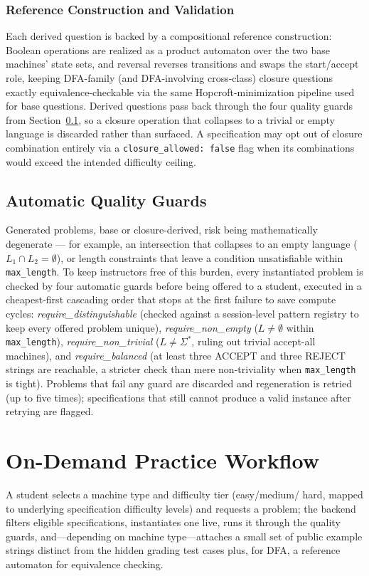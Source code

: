 \documentclass[sigconf]{acmart}
\begin{document}
\subsubsection{Reference Construction and Validation}
Each derived question is backed by a compositional reference construction: Boolean operations are realized as a product automaton over the two base machines' state sets, and reversal reverses transitions and swaps the start/accept role, keeping DFA-family (and DFA-involving cross-class) closure questions exactly equivalence-checkable via the same Hopcroft-minimization pipeline used for base questions. Derived questions pass back through the four quality guards from Section~\ref{sec:guards}, so a closure operation that collapses to a trivial or empty language is discarded rather than surfaced. A specification may opt out of closure combination entirely via a \texttt{closure\_allowed: false} flag when its combinations would exceed the intended difficulty ceiling.
\subsection{Automatic Quality Guards}
\label{sec:guards}
Generated problems, base or closure-derived, risk being mathematically degenerate --- for example, an intersection that collapses to an empty language ($L_1 \cap L_2 = \emptyset$), or length constraints that leave a condition unsatisfiable within \texttt{max\_length}. To keep instructors free of this burden, every instantiated problem is checked by four automatic guards before being offered to a student, executed in a cheapest-first cascading order that stops at the first failure to save compute cycles: \textit{require\_distinguishable} (checked against a session-level pattern registry to keep every offered problem unique), \textit{require\_non\_empty} ($L \neq \emptyset$ within \texttt{max\_length}), \textit{require\_non\_trivial} ($L \neq \Sigma^*$, ruling out trivial accept-all machines), and \textit{require\_balanced} (at least three ACCEPT and three REJECT strings are reachable, a stricter check than mere non-triviality when \texttt{max\_length} is tight). Problems that fail any guard are discarded and regeneration is retried (up to five times); specifications that still cannot produce a valid instance after retrying are flagged.

\section{On-Demand Practice Workflow}
A student selects a machine type and difficulty tier (easy/medium/ hard, mapped to underlying specification difficulty levels) and requests a problem; the backend filters eligible specifications, instantiates one live, runs it through the quality guards, and---depending on machine type---attaches a small set of public example strings distinct from the hidden grading test cases plus, for DFA, a reference automaton for equivalence checking.
\end{document}
